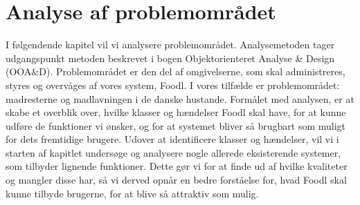 \chapter{Analyse af problemområdet}
\label{chap:analyseafpo}

I følgendende kapitel vil vi analysere problemområdet. Analysemetoden tager udgangspunkt metoden beskrevet i bogen Objektorienteret Analyse \& Design (OOA\&D)\cite[s. ~43]{ooad}. Problemområdet er den del af omgivelserne, som skal administreres, styres og overvåges af vores system, Foodl. I vores tilfælde er problemområdet: madresterne og madlavningen i de danske hustande. Formålet med analysen, er at skabe et overblik over, hvilke klasser og hændelser Foodl skal have, for at kunne udføre de funktioner vi ønsker, og for at systemet bliver så brugbart som muligt for dets fremtidige brugere. Udover at identificere klasser og hændelser, vil vi i starten af kapitlet undersøge og analysere nogle allerede eksisterende systemer, som tilbyder lignende funktioner. Dette gør vi for at finde ud af hvilke kvaliteter og mangler disse har, så vi derved opnår en bedre forståelse for, hvad Foodl skal kunne tilbyde brugerne, for at blive så attraktiv som mulig.



 
            
        

